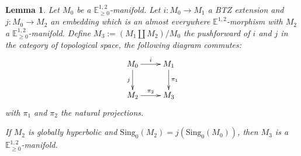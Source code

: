 \documentclass[a4paper,12pt]{article}
\def\sing{\mathrm{Sing}}
\newcommand{\mass}[1]{{\mathbb E}^{1,2}_{#1}}
\newtheorem{lemou}{Lemma}[section]          %
\begin{document}
	\begin{lemou}\label{btzlem:extension_hausdorff} \label{lem:extension_hausdorff}
	Let $M_0$ be a $\mass{\geq0}$-manifold. 	
					Let $i:M_0\rightarrow M_1$ a BTZ extension and $j:M_0\rightarrow M_2$ an embedding which is an almost everywhere $\mass{}$-morphism  with $M_2$ a $\mass{\geq0}$-manifold.
					Define $M_3:=(M_1\coprod M_2)/M_0$ the pushforward of $i$ and $j$ in the category of topological space, the following diagram commutes:
						$$\xymatrix{
							M_0 \ar[r]^{i}\ar[d]_j & M_1\ar[d]^{\pi_1} \\
							M_2\ar[r]^{\pi_2}& M_3
							}$$
			with $\pi_1$ and $\pi_2$ the natural projections.
			
					If $M_2$ is globally hyperbolic and $\sing_0(M_2)=j(\sing_0(M_0))$, then $M_3$ is a $\mass{\geq0}$-manifold.
	
					\end{lemou}
\end{document}
